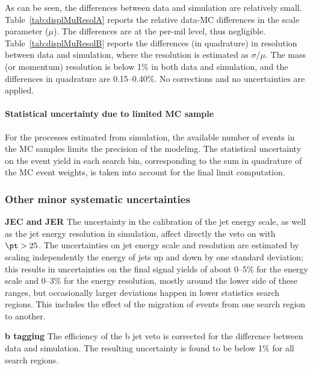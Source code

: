 As can be seen, the differences between data and simulation are
relatively small. Table~\ref{tab:displMuResolA} reports the relative
data-MC differences in the scale parameter ($\mu$). The differences are
at the per-mil level, thus negligible.
Table~\ref{tab:displMuResolB} reports the differences (in quadrature) in
resolution between data and simulation, where the resolution is
estimated as $\sigma/\mu$. The mass (or momentum) resolution is below
1\% in both data and simulation, and the differences in quadrature are
0.15--0.40\%. No corrections and no uncertainties are applied.

\paragraph{Statistical uncertainty due to limited MC sample}
For the processes estimated from simulation, the available number of
events in the MC samples limits the precision of the modeling.
The statistical uncertainty on the event yield in each search bin,
corresponding to the sum in quadrature of the MC event weights, is
taken into account for the final limit computation.



\subsubsection*{Other minor systematic uncertainties}
\textbf{JEC and JER}
The uncertainty in the calibration of the jet energy scale, as well
as the jet energy resolution in simulation, affect directly the veto
on \PQb with $\pt>25$\GeV.
The uncertainties on jet energy scale and resolution are estimated by
scaling independently the energy of jets up and down by one standard
deviation; this results in uncertainties on the final signal yields of about
0--5\% for the energy scale and 0--3\% for the energy resolution,
mostly around the lower side of these ranges, but occasionally larger
deviations happen in lower statistics search regions.
This includes the effect of the migration of events from one search
region to another.

\textbf{b tagging}
The efficiency of the b jet veto is corrected for the difference
between data and simulation.
The resulting uncertainty is found to
be below 1\% for all search regions.

